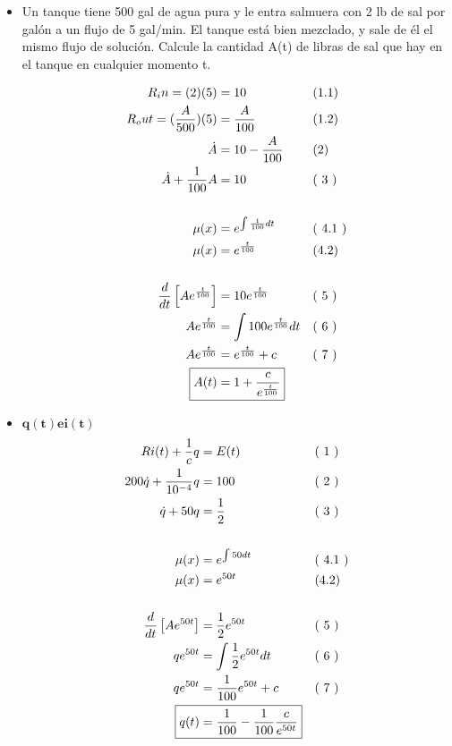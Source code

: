 \documentclass{article}
\newcommand{\newLine}[3]{ #1 & = #2 && \text{(#3)}\\ }
\newcommand{\finalAnswer}[2]{ \Aboxed{ #1 & = #2 } }
\newcommand{\brackets}[1]{ \left[ #1 \right] }
\newcommand{\e}[1]{e^{#1}}
\begin{document}
\begin{flushleft}
\begin{itemize}
            \item Un tanque tiene 500 gal de agua pura y le entra salmuera con 2 lb de sal por galón a un flujo de 5 gal/min. 
            El tanque está bien mezclado, y sale de él el mismo flujo de solución. 
            Calcule la cantidad A(t) de libras de sal que hay en el tanque en cualquier momento t.

            \begin{align*}
                \newLine{R_in = (2)(5) }{ 10 }{1.1}
                \newLine{ R_out = (\frac{A}{500})(5) }{ \frac{A}{100} }{1.2}
                \newLine{\dot{A}} {10-\frac{A}{100}} {2}
                \newLine{ \dot{A} + \frac{1}{100}A } { 10 } { 3 }
                \\
                \newLine{ \mu (x) }{ \e{\int \frac{1}{100} dt} }{ 4.1 }
                \newLine{ \mu(x) } { \e{\frac{t}{100} } } {4.2}
                \\
                \newLine{ \frac{d}{dt}\brackets{ A \e{\frac{t}{100}} } } { 10\e{\frac{t}{100}} } { 5 }
                \newLine{ A \e{\frac{t}{100}} } { \int 100\e{\frac{t}{100}} dt } { 6 }
                \newLine{ A \e{\frac{t}{100}} } { \e{\frac{t}{100}} + c } { 7 }
                \finalAnswer{A(t)}{ 1+ \frac{c}{\e{\frac{t}{100}}} }
            \end{align*}

            \item $\boldsymbol{q(t) e i(t)}$
            \begin{align*}
                \newLine{ Ri(t) + \frac{1}{c}q} { E(t) } { 1 }
                \newLine{ 200\dot{q} + \frac{1}{10^{-4}}q } { 100 } { 2 }
                \newLine{ \dot{q} + 50q } { \frac{1}{2} } { 3 }
                \\
                \newLine{ \mu (x) }{ \e{\int 50 dt} }{ 4.1 }
                \newLine{ \mu(x) } { \e{50t} } {4.2}
                \\
                \newLine{ \frac{d}{dt}\brackets{ A \e{50t} } } { \frac{1}{2}\e{50t} } { 5 }
                \newLine{ q \e{50t} } { \int \frac{1}{2}\e{50t} dt } { 6 }
                \newLine{ q \e{50t} } { \frac{1}{100}\e{50t} + c } { 7 }
                \finalAnswer{q(t)}{ \frac{1}{100} - \frac{1}{100}\frac{c}{\e{50t}} }
            \end{align*}
        \end{itemize}
    \end{flushleft}
\end{document}
